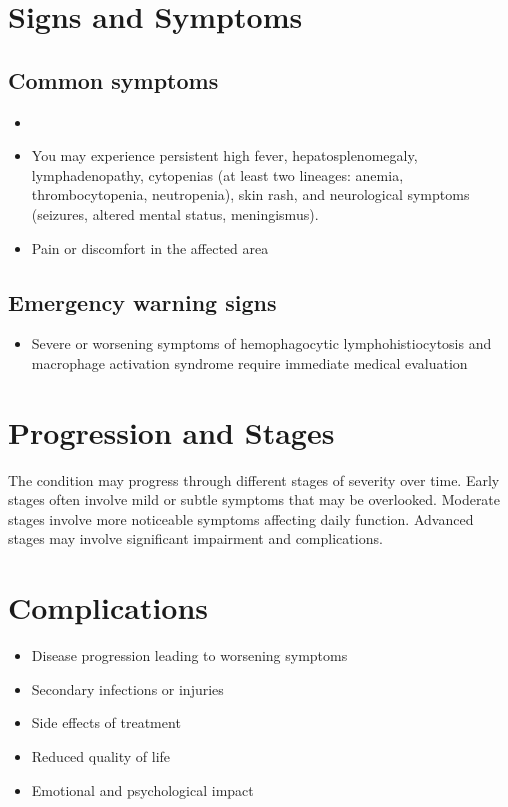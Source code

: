 \section{Signs and Symptoms}

\subsection{Common symptoms}
\begin{itemize}[noitemsep]
  \item \item You may experience persistent high fever, hepatosplenomegaly, lymphadenopathy, cytopenias (at least two lineages: anemia, thrombocytopenia, neutropenia), skin rash, and neurological symptoms (seizures, altered mental status, meningismus).

  \item Pain or discomfort in the affected area
  \end{itemize}

\subsection{Emergency warning signs}
\begin{itemize}[noitemsep]
  \item Severe or worsening symptoms of hemophagocytic lymphohistiocytosis and macrophage activation syndrome require immediate medical evaluation
\end{itemize}
\section{Progression and Stages}
The condition may progress through different stages of severity over time. Early stages often involve mild or subtle symptoms that may be overlooked. Moderate stages involve more noticeable symptoms affecting daily function. Advanced stages may involve significant impairment and complications.
\section{Complications}
\begin{itemize}[noitemsep]
  \item Disease progression leading to worsening symptoms
  \item Secondary infections or injuries
  \item Side effects of treatment
  \item Reduced quality of life
  \item Emotional and psychological impact
\end{itemize}
